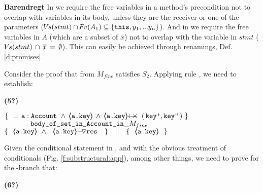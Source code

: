  \vspace{.1cm}

\noindent
\textbf{Barendregt} In  {} we  require   the free variables  in a method's precondition  not to overlap with variables in its body, unless they are the receiver or one of the parameters (${{{\hspace{-1pt}V\hspace{-1pt}}s(stmt) \cap {\hspace{-1pt}F\hspace{-1pt}}v(A_1) \subseteq   \{ \mbox{\normalfont{\texttt{this}}}, y_1, ... y_n \} }}$).  And in {} we require   the free variables in $A$ (which are a subset of  $\overline x$) not to overlap with the variable  in $stmt$ ($ {{ {\hspace{-1pt}V\hspace{-1pt}}s(stmt)\,  \cap\, \overline x\, =\, \emptyset}}$).
This can easily be achieved through renamings, \cf Def. \ref{d:promises}.

\newcommand{\sdsp}{\strut \ \ \ \ \ }

\begin{example} Consider the proof that  from $M_{fine}$ satisfies $S_2$. 
Applying rule {}, we need to establish:\\
\label{e:public}
{\small{ \vspace{.05cm}
  \begin{minipage}{.05\textwidth}
  \textbf{(5?)}\ \ 
\end{minipage}
\hfill
\begin{minipage}{.95\textwidth}
\begin{flushleft}
$\{ \  \   ...\  \prg{a}:\prg{Account}\ \wedge\,  {\inside{\prg{a.key}}} \, \wedge \, \protectedFrom {\prg{a.key}} { (\, \prg{key'},\prg{key''}\, )} \  \} \ $\\
$\ \ \ \ \ \ \ \ \ \ \  \prg{body\_of\_set\_in\_Account\_in}\_ M_{fine}\   $\\
$  \{\  \    {\inside{\prg{a.key}}}\ \wedge\ {\PushASLong {\prg{res}\ } {\ \inside{\prg{a.key}}}} \ \   \} \ \ \  || \ \ \ 
	\{\ \    {\inside{\prg{a.key}}}\ \  \}  $ 
\end{flushleft}
\end{minipage}
}}
\vspace{.03cm}
\noindent
Given the conditional statement in , and with the obvious treatment of conditionals (\cf Fig. \ref{f:substructural:app}), among other things, we  need to prove for the -branch that:\\
\vspace{.01cm}
{\small{  \begin{minipage}{.05\textwidth}
  \textbf{(6?)}\ \ 
\end{minipage}
\hfill
\begin{minipage}{.95\textwidth}

\end{minipage}}}
\end{example}
